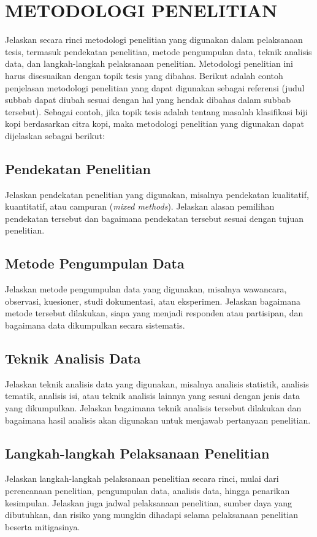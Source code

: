 \cleardoublepage
\chapter{METODOLOGI PENELITIAN}
\label{chap:metodologi-penelitian}
Jelaskan secara rinci metodologi penelitian yang digunakan dalam pelaksanaan tesis, termasuk pendekatan penelitian, metode pengumpulan data, teknik analisis data, dan langkah-langkah pelaksanaan penelitian. Metodologi penelitian ini harus disesuaikan dengan topik tesis yang dibahas. Berikut adalah contoh penjelasan metodologi penelitian yang dapat digunakan sebagai referensi (judul subbab dapat diubah sesuai dengan hal yang hendak dibahas dalam subbab tersebut).
Sebagai contoh, jika topik tesis adalah tentang masalah klasifikasi biji kopi berdasarkan citra kopi, maka metodologi penelitian yang digunakan dapat dijelaskan sebagai berikut:
\section{Pendekatan Penelitian}
Jelaskan pendekatan penelitian yang digunakan, misalnya pendekatan kualitatif, kuantitatif, atau campuran (\textit{mixed methods}). Jelaskan alasan pemilihan pendekatan tersebut dan bagaimana pendekatan tersebut sesuai dengan tujuan penelitian.
\section{Metode Pengumpulan Data}
Jelaskan metode pengumpulan data yang digunakan, misalnya wawancara, observasi, kuesioner, studi dokumentasi, atau eksperimen. Jelaskan bagaimana metode tersebut dilakukan, siapa yang menjadi responden atau partisipan, dan bagaimana data dikumpulkan secara sistematis.
\section{Teknik Analisis Data}
Jelaskan teknik analisis data yang digunakan, misalnya analisis statistik, analisis tematik, analisis isi, atau teknik analisis lainnya yang sesuai dengan jenis data yang dikumpulkan. Jelaskan bagaimana teknik analisis tersebut dilakukan dan bagaimana hasil analisis akan digunakan untuk menjawab pertanyaan penelitian.
\section{Langkah-langkah Pelaksanaan Penelitian}
Jelaskan langkah-langkah pelaksanaan penelitian secara rinci, mulai dari perencanaan penelitian, pengumpulan data, analisis data, hingga penarikan kesimpulan. Jelaskan juga jadwal pelaksanaan penelitian, sumber daya yang dibutuhkan, dan risiko yang mungkin dihadapi selama pelaksanaan penelitian beserta mitigasinya.    
